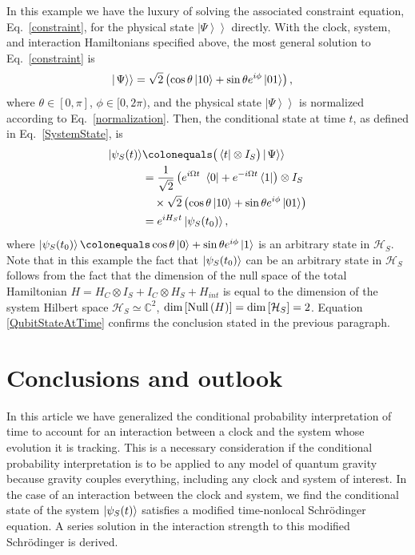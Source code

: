 \documentclass[a4paper,twocolumn,superscriptaddress,11pt,accepted=2019-06-04]{quantumarticle}
\newcommand{\ce}{\colonequals}
\newcommand{\kket}[1]{\left| \left. #1 \right> \right>} 		%
\newcommand{\nn}{\nonumber}		%
\begin{document}
{{In this example we have the luxury of solving the associated constraint equation, Eq.~\eqref{constraint}, for the physical state $\kket{\Psi}$ directly. With the clock, system, and interaction Hamiltonians specified above, the most general solution to Eq.~\eqref{constraint} is
\begin{align}
\kket{\Psi} &= \sqrt{2} \left( \cos \theta \ket{10} + \sin \theta e^{i \phi} \ket{01} \right), \nn
\end{align}
where $\theta \in [0,\pi]$, $\phi \in [0,2\pi)$, and the physical state $\kket{\Psi}$ is normalized according to Eq.~\eqref{normalization}. Then, the conditional state at time $t$, as defined in Eq.~\eqref{SystemState}, is
\begin{align}
\ket{\psi_S(t)} &\ce \big( \bra{t} \otimes I_S\big) \kket{\Psi} \nn \\
&=  \frac{1}{\sqrt{2}} \left( e^{i \Omega t} \ \bra{0} + e^{-i \Omega t} \bra{1} \right) \otimes I_S \nn \\
&\quad \times \sqrt{2} \left( \cos \theta \ket{10} + \sin \theta e^{i \phi} \ket{01} \right)\nn \\
&= e^{i H_S t} \ket{\psi_S(t_0)}, \label{QubitStateAtTime}
\end{align}
where $\ket{\psi_S(t_0)} \ce \cos \theta \ket{0} + \sin \theta e^{i \phi} \ket{1}$ is an arbitrary state in $\mathcal{H}_S$. Note that in this example the fact that $\ket{\psi_S(t_0)}$ can be an arbitrary state in $\mathcal{H}_S$ follows from the fact that the dimension of the null space of the total Hamiltonian $H = H_C \otimes I_S + I_C \otimes H_S +  H_{int}$ is equal to the dimension of the system Hilbert space $\mathcal{H}_S \simeq \mathbb{C}^2$, $\dim \left[ {\rm Null}\left(H\right) \right] = \dim\left[\mathcal{H}_S \right] = 2$. Equation \eqref{QubitStateAtTime} confirms the conclusion stated in the previous paragraph.}



 
\section{Conclusions and outlook}
\label{ch8Summary}


In this article we have generalized the conditional probability interpretation of time to account for an interaction between a clock and the system whose evolution it is tracking. This is a necessary consideration if the conditional probability interpretation is to be applied to any model of quantum gravity because gravity couples everything, including any clock and system of interest. In the case of an interaction between the clock and system, we find the conditional state of the system $\ket{\psi_S(t)}$ satisfies a modified time-nonlocal  Schr\"{o}dinger equation. A series solution in the interaction strength to this modified Schr\"{o}dinger is derived.

}
\end{document}
